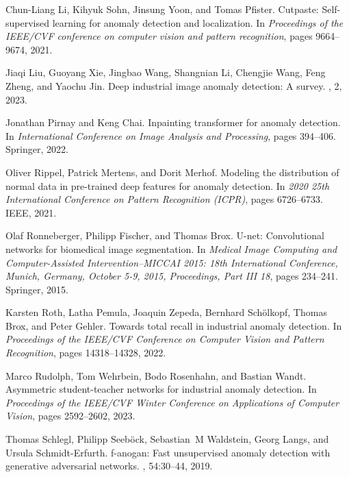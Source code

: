 \documentclass[5p, twocolumn]{elsarticle}[draft]
\begin{document}
\begin{thebibliography}{10}
Chun-Liang Li, Kihyuk Sohn, Jinsung Yoon, and Tomas Pfister.
\newblock Cutpaste: Self-supervised learning for anomaly detection and localization.
\newblock In {\em Proceedings of the IEEE/CVF conference on computer vision and pattern recognition}, pages 9664--9674, 2021.

Jiaqi Liu, Guoyang Xie, Jingbao Wang, Shangnian Li, Chengjie Wang, Feng Zheng, and Yaochu Jin.
\newblock Deep industrial image anomaly detection: A survey.
, 2, 2023.

Jonathan Pirnay and Keng Chai.
\newblock Inpainting transformer for anomaly detection.
\newblock In {\em International Conference on Image Analysis and Processing}, pages 394--406. Springer, 2022.

Oliver Rippel, Patrick Mertens, and Dorit Merhof.
\newblock Modeling the distribution of normal data in pre-trained deep features for anomaly detection.
\newblock In {\em 2020 25th International Conference on Pattern Recognition (ICPR)}, pages 6726--6733. IEEE, 2021.

Olaf Ronneberger, Philipp Fischer, and Thomas Brox.
\newblock U-net: Convolutional networks for biomedical image segmentation.
\newblock In {\em Medical Image Computing and Computer-Assisted Intervention--MICCAI 2015: 18th International Conference, Munich, Germany, October 5-9, 2015, Proceedings, Part III 18}, pages 234--241. Springer, 2015.

Karsten Roth, Latha Pemula, Joaquin Zepeda, Bernhard Sch{\"o}lkopf, Thomas Brox, and Peter Gehler.
\newblock Towards total recall in industrial anomaly detection.
\newblock In {\em Proceedings of the IEEE/CVF Conference on Computer Vision and Pattern Recognition}, pages 14318--14328, 2022.

Marco Rudolph, Tom Wehrbein, Bodo Rosenhahn, and Bastian Wandt.
\newblock Asymmetric student-teacher networks for industrial anomaly detection.
\newblock In {\em Proceedings of the IEEE/CVF Winter Conference on Applications of Computer Vision}, pages 2592--2602, 2023.

Thomas Schlegl, Philipp Seeb{\"o}ck, Sebastian~M Waldstein, Georg Langs, and Ursula Schmidt-Erfurth.
\newblock f-anogan: Fast unsupervised anomaly detection with generative adversarial networks.
, 54:30--44, 2019.


\end{thebibliography}
\end{document}
